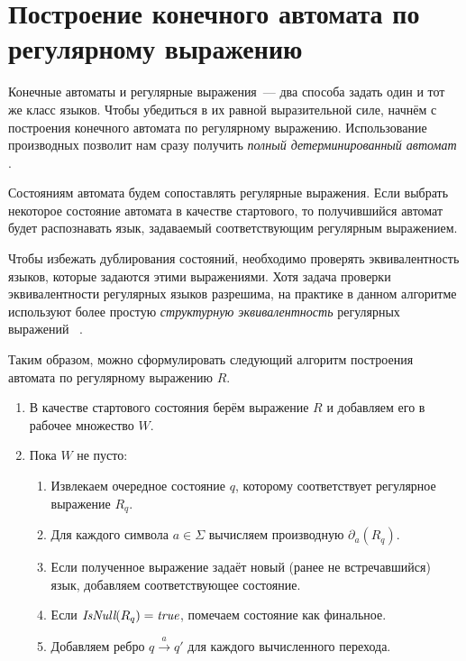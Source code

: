 \section{Построение конечного автомата по регулярному выражению}
\label{sec:RegexToFA}

Конечные автоматы и регулярные выражения~--- два способа задать один и тот же класс языков.
Чтобы убедиться в их равной выразительной силе, начнём с построения конечного автомата по регулярному выражению.
Использование производных позволит нам сразу получить \emph{полный детерминированный автомат}%
.

Состояниям автомата будем сопоставлять регулярные выражения.
Если выбрать некоторое состояние автомата в качестве стартового, то получившийся автомат будет распознавать язык, задаваемый соответствующим регулярным выражением.

Чтобы избежать дублирования состояний, необходимо проверять эквивалентность языков, которые задаются этими выражениями.
Хотя задача проверки эквивалентности регулярных языков разрешима, на практике в данном алгоритме используют более простую \emph{структурную эквивалентность} регулярных выражений%
~.


Таким образом, можно сформулировать следующий алгоритм построения автомата по регулярному выражению $R$.

\begin{enumerate}
    \item В качестве стартового состояния берём выражение $R$ и добавляем его в рабочее множество $W$.
    \item Пока $W$ не пусто:
    \begin{enumerate}
        \item Извлекаем очередное состояние $q$, которому соответствует регулярное выражение $R_q$.
        \item Для каждого символа $a \in \Sigma$ вычисляем производную $\partial_a(R_q)$.
        \item Если полученное выражение задаёт новый (ранее не встречавшийся) язык, добавляем соответствующее состояние.
        \item Если $\emph{IsNull}(R_q) = \emph{true}$, помечаем состояние как финальное.
        \item Добавляем ребро $q \xrightarrow{a} q'$ для каждого вычисленного перехода.
    \end{enumerate}
\end{enumerate}

